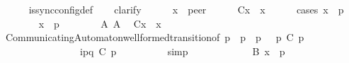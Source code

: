 \begin{isabellebody}
\ \ \ \ \isamarkupfalse%
\ is{\isacharunderscore}{\kern0pt}sync{\isacharunderscore}{\kern0pt}config{\isacharunderscore}{\kern0pt}def\isanewline
\ \ \isamarkupfalse%
\ clarify\isanewline
\ \ \ \ \isamarkupfalse%
\ x\ {\isacharcolon}{\kern0pt}{\isacharcolon}{\kern0pt}\ {\isachardoublequoteopen}{\isacharprime}{\kern0pt}peer{\isachardoublequoteclose}\isanewline
\ \ \ \ \isamarkupfalse%
\ {\isachardoublequoteopen}C{}{\isacharparenleft}{\kern0pt}x{\isacharparenright}{\kern0pt}\ {\isasymin}\ {\isasymS}{\isacharparenleft}{\kern0pt}x{\isacharparenright}{\kern0pt}{\isachardoublequoteclose}\isanewline
\ \ \ \ \isamarkupfalse%
\ {\isacharparenleft}{\kern0pt}cases\ {\isachardoublequoteopen}x\ {\isacharequal}{\kern0pt}\ p{\isachardoublequoteclose}{\isacharparenright}{\kern0pt}\isanewline
\ \ \ \ \ \ \isamarkupfalse%
\ {\isachardoublequoteopen}x\ {\isacharequal}{\kern0pt}\ p{\isachardoublequoteclose}\isanewline
\ \ \ \ \ \ \isamarkupfalse%
\ A{}\ A{}\ \isamarkupfalse%
\ {\isachardoublequoteopen}C{}{\isacharparenleft}{\kern0pt}x{\isacharparenright}{\kern0pt}\ {\isasymin}\ {\isasymS}{\isacharparenleft}{\kern0pt}x{\isacharparenright}{\kern0pt}{\isachardoublequoteclose}\isanewline
\ \ \ \ \ \ \ \ \isamarkupfalse%
\ CommunicatingAutomaton{\isachardot}{\kern0pt}well{\isacharunderscore}{\kern0pt}formed{\isacharunderscore}{\kern0pt}transition{\isacharbrackleft}{\kern0pt}of\ p\ {\isachardoublequoteopen}{\isasymS}\ p{\isachardoublequoteclose}\ {\isachardoublequoteopen}{\isasymI}\ p{\isachardoublequoteclose}\ {\isasymM}\ {\isachardoublequoteopen}{\isasymR}\ p{\isachardoublequoteclose}\ {\isachardoublequoteopen}C{}\ p{\isachardoublequoteclose}\isanewline
\ \ \ \ \ \ \ \ \ \ \ \ \ \ \ \ {\isachardoublequoteopen}{\isacharbang}{\kern0pt}{\isasymlangle}{\isacharparenleft}{\kern0pt}i\isactrlbsup p{\isasymrightarrow}q\isactrlesup {\isacharparenright}{\kern0pt}{\isasymrangle}{\isachardoublequoteclose}\ {\isachardoublequoteopen}C{}\ p{\isachardoublequoteclose}{\isacharbrackright}{\kern0pt}\isanewline
\ \ \ \ \ \ \ \ \isamarkupfalse%
\ simp\isanewline
\ \ \ \ \isamarkupfalse%
\isanewline
\ \ \ \ \ \ \isamarkupfalse%
\ B{\isacharcolon}{\kern0pt}\ {\isachardoublequoteopen}x\ {\isasymnoteq}\ p{\isachardoublequoteclose}\isanewline
\ \ \ \ \ \ \isamarkupfalse%

\end{isabellebody}

